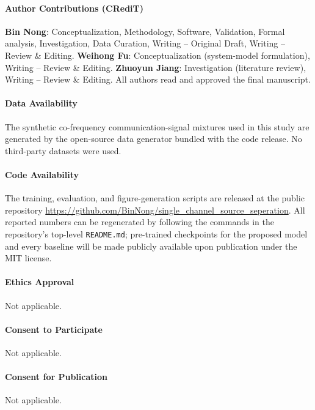\documentclass[twocolumn,english]{svjour3}
\begin{document}
\paragraph{Author Contributions (CRediT)}
\textbf{Bin Nong}: Conceptualization, Methodology, Software, Validation, Formal analysis, Investigation, Data Curation, Writing -- Original Draft, Writing -- Review \& Editing. \textbf{Weihong Fu}: Conceptualization (system-model formulation), Writing -- Review \& Editing. \textbf{Zhuoyun Jiang}: Investigation (literature review), Writing -- Review \& Editing. All authors read and approved the final manuscript.

\paragraph{Data Availability}
\begin{sloppypar}
The synthetic co-frequency communication-signal mixtures used in this study are generated by the open-source data generator bundled with the code release. No third-party datasets were used.
\end{sloppypar}

\paragraph{Code Availability}
\begin{sloppypar}
The training, evaluation, and figure-generation scripts are released at the public repository \url{https://github.com/BinNong/single_channel_source_seperation}. All reported numbers can be regenerated by following the commands in the repository's top-level \texttt{README.md}; pre-trained checkpoints for the proposed model and every baseline will be made publicly available upon publication under the MIT license.
\end{sloppypar}

\paragraph{Ethics Approval}
Not applicable.

\paragraph{Consent to Participate}
Not applicable.

\paragraph{Consent for Publication}
Not applicable.
\end{document}
